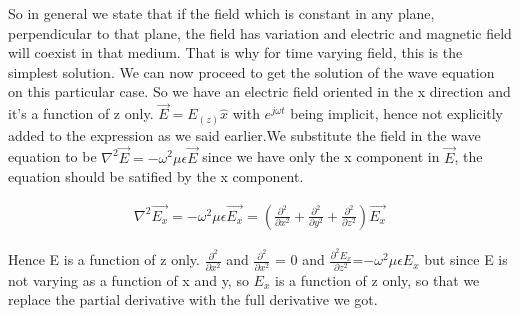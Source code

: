 			So in general we state that if the field which is constant in any plane, perpendicular to that plane, the field has variation and electric and magnetic field will coexist in that medium. That is why for time varying field, this is the simplest solution. We can now proceed to get the solution of the wave equation on this particular case. So we have an electric field oriented in the x direction and it's a function of z only. $\vec{E}=E_(z)\hat{x}$ with $e^{j\omega t}$ being implicit, hence not explicitly added to the expression as we said earlier.We substitute the field in the wave equation to be $\nabla^2\vec{E}=-\omega^2\mu\epsilon\vec{E}$ since we have only the x component in $\vec{E}$, the equation should be satified by the x component.
			
			\bigskip
			
			\begin{align}
				\nabla^2\vec{E_{x}}=-\omega^2\mu\epsilon\vec{E_{x}} =( {\frac{\partial^2}{\partial x^2} + \frac{\partial^2}{\partial y^2} + \frac{\partial^2}{\partial z^2}})\vec{E_{x}}
			\end{align}
	
			\bigskip
			
			Hence E is a function of z only.
			$\frac{\partial^2}{\partial x^2}$ and $\frac{\partial^2}{\partial x^2}$ = 0 and $\frac{\partial^2  E_x}{\partial z^2}$=$-\omega^2\mu\epsilon E_{x}$ but since E is not varying as a function of x and y, so $E_x$ is a function of z only, so that we replace the partial derivative with the full derivative we got.
			
			\bigskip
			

